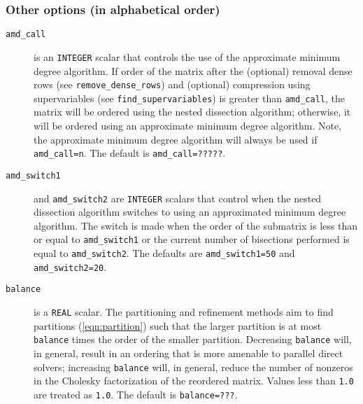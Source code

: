 \subsubsection*{Other options (in alphabetical order)}

\begin{description}
\item[\texttt{amd\_call}] is an {\tt INTEGER} scalar that controls the use of 
the approximate minimum degree algorithm. If order of the matrix after the 
(optional) removal dense rows (see {\tt remove\_dense\_rows}) and (optional) 
compression using supervariables (see {\tt find\_supervariables}) is greater 
than {\tt amd\_call}, the matrix will be ordered using the nested dissection 
algorithm; otherwise, it will be ordered using an approximate minimum 
degree algorithm. Note, the approximate minimum degree algorithm will always be used if {\tt amd\_call=n}. The 
default is {\tt amd\_call=?????}.

\item[\texttt{amd\_switch1}] and {\tt amd\_switch2} are {\tt INTEGER} scalars 
that control when the nested dissection algorithm switches to using an approximated minimum 
degree algorithm. The switch is made when the order of the submatrix is less 
than or equal to {\tt amd\_switch1} or the current number of 
bisections performed is equal to {\tt amd\_switch2}.  The 
defaults are {\tt amd\_switch1=50} and {\tt amd\_switch2=20}.

\item[\texttt{balance}] is a {\tt REAL} scalar. The partitioning and refinement
methods aim to find partitions (\ref{eqn:partition}) such that the larger 
partition is at most {\tt balance} times the order of the smaller partition. 
Decreasing {\tt balance} will, in
general, result in an ordering that is more amenable to
parallel direct solvers; increasing {\tt balance} will, in general, reduce the
number of nonzeros in the Cholesky factorization of the reordered matrix. 
Values less than {\tt 1.0} are treated as {\tt 1.0}. The
default is {\tt balance=???}.



\end{description}
